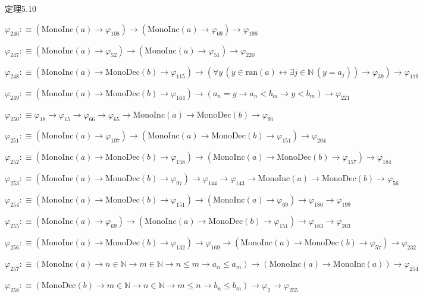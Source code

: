 \begin{fullproof}{定理5.10}
\begin{abbrevlist}
\item $\varphi_{246} :\equiv (\mathrm{MonoInc}(a) \to \varphi_{108}) \to (\mathrm{MonoInc}(a) \to \varphi_{69}) \to \varphi_{198}$
\item $\varphi_{247} :\equiv (\mathrm{MonoInc}(a) \to \varphi_{52}) \to (\mathrm{MonoInc}(a) \to \varphi_{51}) \to \varphi_{220}$
\item $\varphi_{248} :\equiv (\mathrm{MonoInc}(a) \to \mathrm{MonoDec}(b) \to \varphi_{115}) \to (\forall y\,(y \in \mathrm{ran}(a) \leftrightarrow \exists j \in \mathbb{N}\,(y = a_{j})) \to \varphi_{39}) \to \varphi_{179}$
\item $\varphi_{249} :\equiv (\mathrm{MonoInc}(a) \to \mathrm{MonoDec}(b) \to \varphi_{164}) \to (a_{n} = y \to a_{n} < b_{m} \to y < b_{m}) \to \varphi_{221}$
\item $\varphi_{250} :\equiv \varphi_{18} \to \varphi_{15} \to \varphi_{66} \to \varphi_{65} \to \mathrm{MonoInc}(a) \to \mathrm{MonoDec}(b) \to \varphi_{91}$
\item $\varphi_{251} :\equiv (\mathrm{MonoInc}(a) \to \varphi_{107}) \to (\mathrm{MonoInc}(a) \to \mathrm{MonoDec}(b) \to \varphi_{151}) \to \varphi_{204}$
\item $\varphi_{252} :\equiv (\mathrm{MonoInc}(a) \to \mathrm{MonoDec}(b) \to \varphi_{158}) \to (\mathrm{MonoInc}(a) \to \mathrm{MonoDec}(b) \to \varphi_{157}) \to \varphi_{184}$
\item $\varphi_{253} :\equiv (\mathrm{MonoInc}(a) \to \mathrm{MonoDec}(b) \to \varphi_{97}) \to \varphi_{144} \to \varphi_{143} \to \mathrm{MonoInc}(a) \to \mathrm{MonoDec}(b) \to \varphi_{56}$
\item $\varphi_{254} :\equiv (\mathrm{MonoInc}(a) \to \mathrm{MonoDec}(b) \to \varphi_{151}) \to (\mathrm{MonoInc}(a) \to \varphi_{69}) \to \varphi_{180} \to \varphi_{199}$
\item $\varphi_{255} :\equiv (\mathrm{MonoInc}(a) \to \varphi_{69}) \to (\mathrm{MonoInc}(a) \to \mathrm{MonoDec}(b) \to \varphi_{151}) \to \varphi_{183} \to \varphi_{203}$
\item $\varphi_{256} :\equiv (\mathrm{MonoInc}(a) \to \mathrm{MonoDec}(b) \to \varphi_{132}) \to \varphi_{169} \to (\mathrm{MonoInc}(a) \to \mathrm{MonoDec}(b) \to \varphi_{57}) \to \varphi_{232}$
\item $\varphi_{257} :\equiv (\mathrm{MonoInc}(a) \to n \in \mathbb{N} \to m \in \mathbb{N} \to n \leq m \to a_{n} \leq a_{m}) \to (\mathrm{MonoInc}(a) \to \mathrm{MonoInc}(a)) \to \varphi_{254}$
\item $\varphi_{258} :\equiv (\mathrm{MonoDec}(b) \to m \in \mathbb{N} \to n \in \mathbb{N} \to m \leq n \to b_{n} \leq b_{m}) \to \varphi_{2} \to \varphi_{255}$

\end{abbrevlist}
\end{fullproof}
